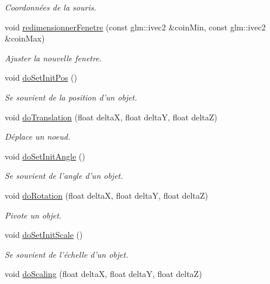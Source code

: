 \begin{DoxyCompactItemize}
\begin{DoxyCompactList}\small\item\em Coordonnées de la souris. \end{DoxyCompactList}\item 
void \hyperlink{group__inf2990_ga0a03742a7fa2215a6dd6de99cbfd7b05}{redimensionner\-Fenetre} (const glm\-::ivec2 \&coin\-Min, const glm\-::ivec2 \&coin\-Max)
\begin{DoxyCompactList}\small\item\em Ajuster la nouvelle fenetre. \end{DoxyCompactList}\item 
void \hyperlink{group__inf2990_gacbc609209644f410f7a576a8d1e509d0}{do\-Set\-Init\-Pos} ()
\begin{DoxyCompactList}\small\item\em Se souvient de la position d'un objet. \end{DoxyCompactList}\item 
void \hyperlink{group__inf2990_ga3c29bb5fb742aacf7bea3f62357c4f48}{do\-Translation} (float delta\-X, float delta\-Y, float delta\-Z)
\begin{DoxyCompactList}\small\item\em Déplace un noeud. \end{DoxyCompactList}\item 
void \hyperlink{group__inf2990_gadf7aee8a39d60a055bef3cd05cdda2db}{do\-Set\-Init\-Angle} ()
\begin{DoxyCompactList}\small\item\em Se souvient de l'angle d'un objet. \end{DoxyCompactList}\item 
void \hyperlink{group__inf2990_ga51bb0f8d8e9a6c421ca688e83e10d670}{do\-Rotation} (float delta\-X, float delta\-Y, float delta\-Z)
\begin{DoxyCompactList}\small\item\em Pivote un objet. \end{DoxyCompactList}\item 
void \hyperlink{group__inf2990_gaccc885ec8fc20fa6709a2f74a609ce32}{do\-Set\-Init\-Scale} ()
\begin{DoxyCompactList}\small\item\em Se souvient de l'échelle d'un objet. \end{DoxyCompactList}\item 
void \hyperlink{group__inf2990_gac8decb6e4a3eabfa6baa89022aaab8eb}{do\-Scaling} (float delta\-X, float delta\-Y, float delta\-Z)

\end{DoxyCompactItemize}
